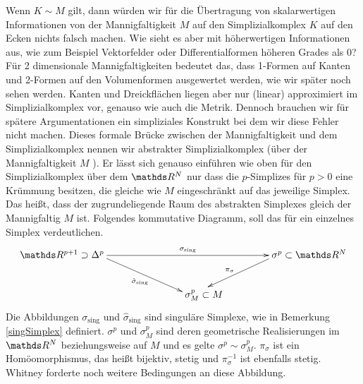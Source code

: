     \begin{bemerkung}
      Wenn \( K \sim M \) gilt, dann würden wir für die Übertragung von skalarwertigen Informationen von der Mannigfaltigkeit
      \( M \) auf den Simplizialkomplex \( K \) auf den Ecken nichts falsch machen.
      Wie sieht es aber mit höherwertigen Informationen aus, wie zum Beispiel Vektorfelder oder Differentialformen höheren Grades als 0? Für 2 dimensionale Mannigfaltigkeiten bedeutet das, dass 1-Formen auf Kanten und 2-Formen auf den Volumenformen ausgewertet werden, wie wir später noch sehen werden. 
      Kanten und Dreickflächen liegen aber nur (linear) approximiert im Simplizialkomplex vor, genauso wie auch die Metrik.
      Dennoch brauchen wir für spätere Argumentationen ein simpliziales Konstrukt bei dem wir diese Fehler nicht machen.
      Dieses formale Brücke zwischen der Mannigfaltigkeit und dem Simplizialkomplex nennen wir abstrakter Simplizialkomplex (über der Mannigfaltigkeit \( M \) ). 
      Er lässt sich genauso einführen wie oben für den Simplizialkomplex über dem \( \R^{N} \) 
      nur dass die \(p\)-Simplizes für \( p > 0 \) eine Krümmung besitzen, die gleiche wie \( M \) eingeschränkt auf das jeweilige Simplex.
      Das heißt, dass der zugrundeliegende Raum des abstrakten Simplexes gleich der Mannigfaltig \( M \) ist.
      Folgendes kommutative Diagramm, soll das für ein einzelnes Simplex verdeutlichen.
      \begin{align}
        \begin{xy}
          \xymatrix{
            **[l] \R^{p+1} \supset \Delta^{p} \ar[rr]^{\sigma_{\text{sing}}} \ar[rd]_{\hat{\sigma}_{\text{sing}}} 
            & & **[r] \sigma^{p} \subset \R^{N} \ar[ld]_{\pi_{\sigma}} \\
                                       & **[r] \sigma^{p}_{M}\subset M&
          }
        \end{xy}
      \end{align}
      Die Abbildungen \( \sigma_{\text{sing}} \) und \( \hat{\sigma}_{\text{sing}} \) sind singuläre Simplexe, wie in
      Bemerkung \ref{singSimplex} definiert. \( \sigma^{p} \) und \( \sigma^{p}_{M} \) sind deren geometrische Realisierungen im \( \R^{N} \) beziehungsweise auf \( M \)
      und es gelte \( \sigma^{p} \sim \sigma^{p}_{M} \).
      \( \pi_{\sigma} \) ist ein Homöomorphismus, das heißt bijektiv, stetig und \( \pi_{\sigma}^{-1} \) ist ebenfalls stetig. 
      Whitney \cite{whitney} forderte noch weitere Bedingungen an diese Abbildung. 

\end{bemerkung}
